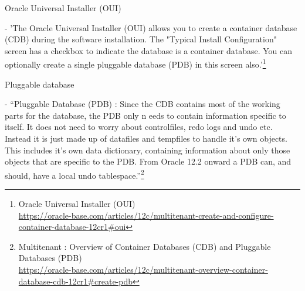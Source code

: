 \begin{itemize*}
\item{\begin{bf}Oracle Universal Installer (OUI)\end{bf}} - 'The Oracle
  Universal Installer (OUI) allows you to create a container database (CDB)
  during the software installation. The "Typical Install Configuration"
  screen has a checkbox to indicate the database is a container database.
  You can optionally create a single pluggable database (PDB) in this
  screen also.'\footnote{Oracle Universal Installer (OUI)\\
    \href{https://oracle-base.com/articles/12c/multitenant-create-and-configure-container-database-12cr1\#oui}{https://oracle-base.com/articles/12c/multitenant-create-and-configure-container-database-12cr1\#oui}}

\item{\begin{bf}Pluggable database\end{bf}} - ``Pluggable Database (PDB) : Since 
the CDB contains most of the working parts for the database, the PDB only n
eeds to contain information specific to itself. It does not need to worry about 
controlfiles, redo logs and undo etc. Instead it is just made up of datafiles 
and tempfiles to handle it's own objects. This includes it's own data dictionary, 
containing information about only those objects that are specific to the PDB. 
From Oracle 12.2 onward a PDB can, and should, have a local undo tablespace.''\footnote{Multitenant : Overview of Container Databases (CDB) and Pluggable Databases (PDB)\\
\href{https://oracle-base.com/articles/12c/multitenant-overview-container-database-cdb-12cr1\#create-pdb}{https://oracle-base.com/articles/12c/multitenant-overview-container-database-cdb-12cr1\#create-pdb}}




\end{itemize*}





